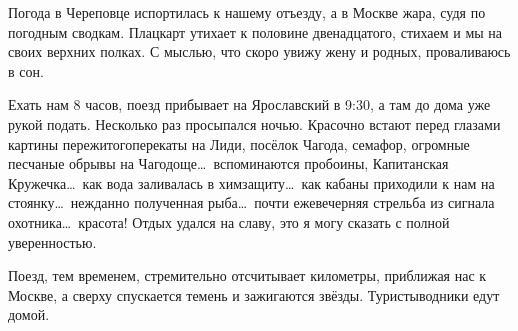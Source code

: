 Погода в Череповце испортилась к нашему отъезду, а в Москве жара, судя по погодным сводкам. Плацкарт утихает к половине двенадцатого, стихаем и мы на своих верхних полках. С мыслью, что скоро увижу жену и родных, проваливаюсь в сон. 

Ехать нам 8 часов, поезд прибывает на Ярославский в 9:30, а там до дома уже рукой подать. Несколько раз просыпался ночью. Красочно встают перед глазами картины пережитого\mdash перекаты на Лиди, посёлок Чагода, семафор, огромные песчаные обрывы на Чагодоще\ldots~вспоминаются пробоины, Капитанская Кружечка\ldots~как вода заливалась в химзащиту\ldots~как кабаны приходили к нам на стоянку\ldots~нежданно полученная рыба\ldots~почти ежевечерняя стрельба из сигнала охотника\ldots~красота! Отдых удался на славу, это я могу сказать с полной уверенностью. 

Поезд, тем временем, стремительно отсчитывает километры, приближая нас к Москве, а сверху спускается темень и зажигаются звёзды. Туристы\sdash водники едут домой.     

\begin{center}
\end{center}